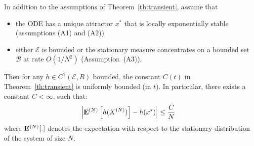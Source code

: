 \documentclass[sigconf]{acmart}
\newcommand\XN{X^{(N)}}
\newcommand\E{\mathcal{E}}
\newcommand\calB{\mathcal{B}}
\newcommand\espN[1]{{\mathchoice{\bespN{#1}}{\sespN{#1}}{\sespN{#1}}{\sespN{#1}}}}
\newcommand\bespN[1]{\mathbf{E}^{(N)}\left[#1\right]}
\newcommand\sespN[1]{\mathbf{E}^{(N)}[#1]}
\newcommand\abs[1]{\left|#1\right|}
\begin{document}
\begin{theorem}
  \label{th:stationary}
  In addition to the assumptions of Theorem~\ref{th:transient}, assume
  that
  \begin{itemize}
  \item the ODE has a unique attractor $x^*$ that is locally
    exponentially stable (assumptions (A1) and (A2))
  \item either $\E$ is bounded or the stationary measure concentrates
    on a bounded set $\calB$ at rate $O(1/N^2)$ (Assumption~(A3)).
  \end{itemize}
  Then for any $h\in C^{2}(\E,R)$ bounded, the constant $C(t)$ in
  Theorem~\ref{th:transient} is uniformly bounded (in $t$). In
  particular, there exists a constant $C<\infty$, such that:
  \begin{align}
    \label{eq:th_stationary}
    \abs{\espN{h(\XN)}-h(x^*)} \le \frac{C}{N}
  \end{align}
  where $\espN{.}$ denotes the expectation with respect to the
  stationary distribution of the system of size $N$.
\end{theorem}
\end{document}
